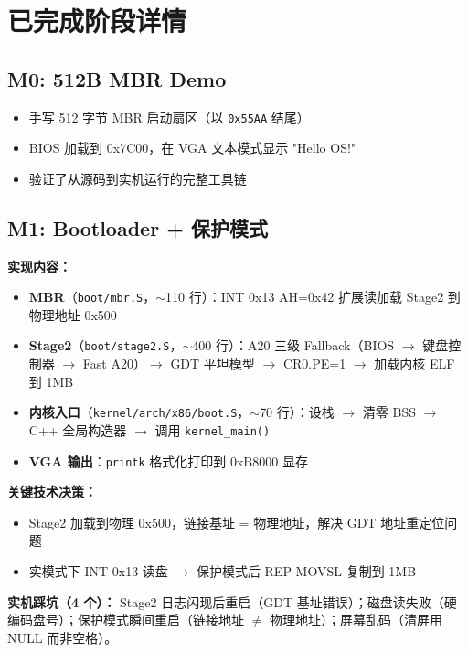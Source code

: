 \documentclass[12pt,a4paper]{article}
\begin{document}
\section{已完成阶段详情}

\subsection{M0: 512B MBR Demo}

\begin{itemize}
    \item 手写 512 字节 MBR 启动扇区（以 \texttt{0x55AA} 结尾）
    \item BIOS 加载到 0x7C00，在 VGA 文本模式显示 "Hello OS!"
    \item 验证了从源码到实机运行的完整工具链
\end{itemize}

\subsection{M1: Bootloader + 保护模式}

\textbf{实现内容：}
\begin{itemize}
    \item \textbf{MBR}（\texttt{boot/mbr.S}，$\sim$110 行）：INT 0x13 AH=0x42 扩展读加载 Stage2 到物理地址 0x500
    \item \textbf{Stage2}（\texttt{boot/stage2.S}，$\sim$400 行）：A20 三级 Fallback（BIOS $\to$ 键盘控制器 $\to$ Fast A20）$\to$ GDT 平坦模型 $\to$ CR0.PE=1 $\to$ 加载内核 ELF 到 1MB
    \item \textbf{内核入口}（\texttt{kernel/arch/x86/boot.S}，$\sim$70 行）：设栈 $\to$ 清零 BSS $\to$ C++ 全局构造器 $\to$ 调用 \texttt{kernel\_main()}
    \item \textbf{VGA 输出}：\texttt{printk} 格式化打印到 0xB8000 显存
\end{itemize}

\textbf{关键技术决策：}
\begin{itemize}
    \item Stage2 加载到物理 0x500，链接基址 = 物理地址，解决 GDT 地址重定位问题
    \item 实模式下 INT 0x13 读盘 $\to$ 保护模式后 REP MOVSL 复制到 1MB
\end{itemize}

\textbf{实机踩坑（4 个）：} Stage2 日志闪现后重启（GDT 基址错误）；磁盘读失败（硬编码盘号）；保护模式瞬间重启（链接地址 $\neq$ 物理地址）；屏幕乱码（清屏用 NULL 而非空格）。
\end{document}
